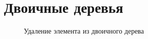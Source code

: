 \documentclass[a4paper, 12pt]{article}
\begin{document}
\section{Двоичные деревья}

\begin{figure}[h!]
  \caption{Удаление элемента из двоичного дерева}
  \label{delte_tree}
\end{figure}
\end{document}
